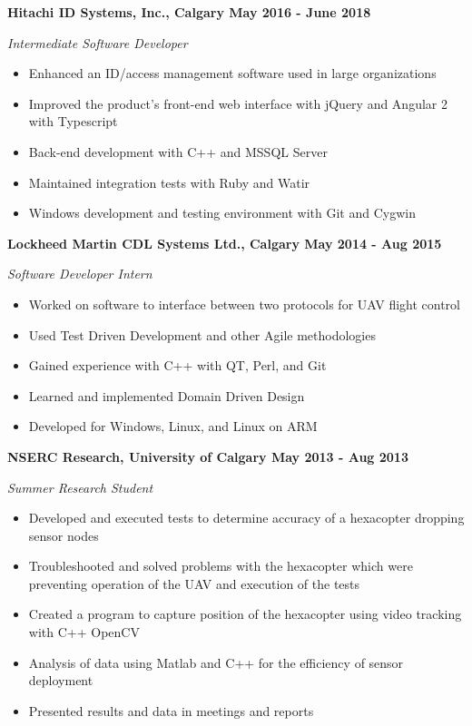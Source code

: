 \documentclass[12pt]{article}
\begin{document}
\noindent \centerline{ \bf Hitachi ID Systems, Inc., Calgary \hfill May 2016 - June 2018}
\indent \emph{ Intermediate Software Developer }
\begin{itemize}
  \item Enhanced an ID/access management software used in large organizations
  \item Improved the product's front-end web interface with jQuery and Angular 2 with Typescript
  \item Back-end development with C++ and MSSQL Server
  \item Maintained integration tests with Ruby and Watir
  \item Windows development and testing environment with Git and Cygwin
\end{itemize}

\noindent \centerline{ \bf Lockheed Martin CDL Systems Ltd., Calgary \hfill May 2014 - Aug 2015}
\indent \emph{ Software Developer Intern }
\begin{itemize}
  \item Worked on software to interface between two protocols for UAV flight control
  \item Used Test Driven Development and other Agile methodologies
  \item Gained experience with C++ with QT, Perl, and Git
  \item Learned and implemented Domain Driven Design
  \item Developed for Windows, Linux, and Linux on ARM
\end{itemize}

\noindent \centerline{ \bf NSERC Research, University of Calgary \hfill May 2013 - Aug 2013}
\indent \emph{ Summer Research Student }
\begin{itemize}
  \item Developed and executed tests to determine accuracy of a hexacopter dropping sensor nodes
  \item Troubleshooted and solved problems with the hexacopter which were preventing operation of the UAV and execution of the tests
  \item Created a program to capture position of the hexacopter using video tracking with C++ OpenCV
  \item Analysis of data using Matlab and C++ for the efficiency of sensor deployment
  \item Presented results and data in meetings and reports
\end{itemize}
\end{document}
